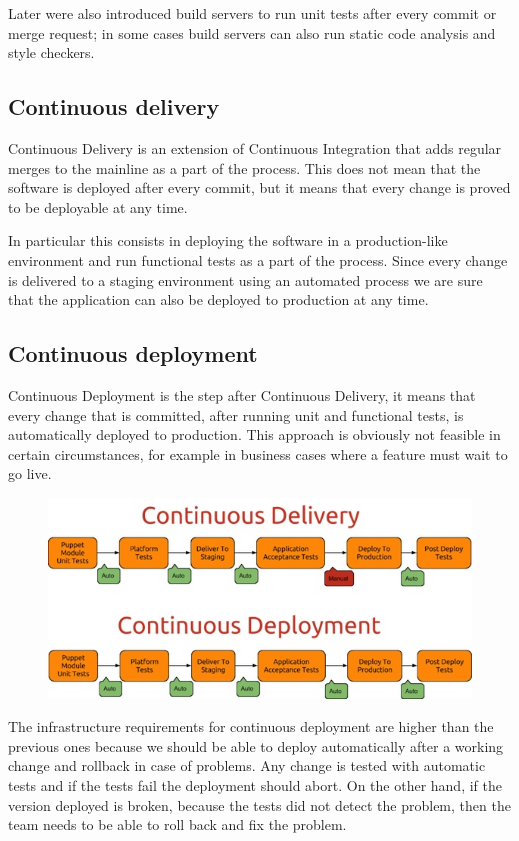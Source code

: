 Later were also introduced build servers to run unit tests after every commit
or merge request; in some cases build servers can also run static code analysis
and style checkers.

\subsection{Continuous delivery}

Continuous Delivery is an extension of Continuous Integration that adds regular
merges to the mainline as a part of the process. This does not mean that the
software is deployed after every commit, but it means that every change is
proved to be deployable at any time.

In particular this consists in deploying the software in a production-like
environment and run functional tests as a part of the process. Since every
change is delivered to a staging environment using an automated process we are
sure that the application can also be deployed to production at any time.

\subsection{Continuous deployment}

Continuous Deployment is the step after Continuous Delivery, it means that
every change that is committed, after running unit and functional tests, is
automatically deployed to production. This approach is obviously not feasible
in certain circumstances, for example in business cases where a feature must
wait to go live.

\begin{figure}[H]
\includegraphics[width=\textwidth,height=\textheight,keepaspectratio]{Introduction/Continuous_Delivery_Continuous_Deployment.jpg}
\end{figure}

The infrastructure requirements for continuous deployment are higher than
the previous ones because we should be able to deploy automatically after
a working change and rollback in case of problems. Any change is tested
with automatic tests and if the tests fail the deployment should abort. On
the other hand, if the version deployed is broken, because the tests did
not detect the problem, then the team needs to be able to roll back and
fix the problem.

